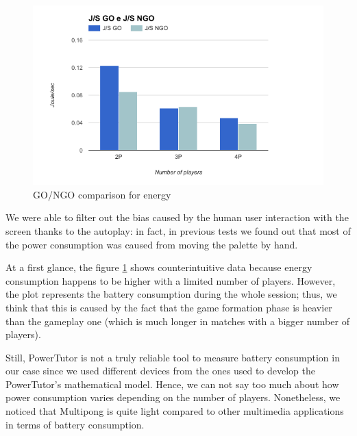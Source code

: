 \begin{figure}[H]
	\includegraphics[width=\columnwidth]{img/energy.png}
	
	\caption{GO/NGO comparison for energy}\label{fig:energy}
\end{figure}


We were able to filter out the bias caused by the human user interaction with
the screen thanks to the autoplay: in fact, in previous tests we found out
that most of the power consumption was caused from moving the palette by hand.

At a first glance, the figure \ref{fig:energy} shows counterintuitive data
because energy consumption happens to be higher with a limited number of
players. However, the plot represents the  battery consumption
during the whole session; thus, we think that this is caused by the fact that
the game formation phase is heavier than the gameplay one (which is much longer
in matches with a bigger number of players).

Still, PowerTutor is not a truly reliable tool to measure battery consumption in
our case since we used different devices from the ones used to develop the
PowerTutor's mathematical model. Hence, we can not say too much about how power
consumption varies depending on the number of players. Nonetheless, we noticed
that Multipong is quite light compared to other multimedia applications in
terms of battery consumption.

